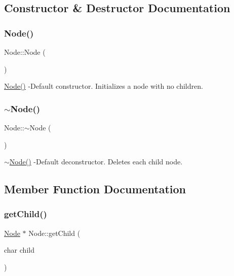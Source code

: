 \subsection{Constructor \& Destructor Documentation}
\mbox{\label{class_node_ad7a34779cad45d997bfd6d3d8043c75f}} 
\subsubsection{\texorpdfstring{Node()}{Node()}}
{\footnotesize\ttfamily Node\+::\+Node (\begin{DoxyParamCaption}{ }\end{DoxyParamCaption})}

\hyperlink{class_node_ad7a34779cad45d997bfd6d3d8043c75f}{Node()} -\/\+Default constructor. Initializes a node with no children. \mbox{\label{class_node_aa0840c3cb5c7159be6d992adecd2097c}} 
\subsubsection{\texorpdfstring{$\sim$\+Node()}{~Node()}}
{\footnotesize\ttfamily Node\+::$\sim$\+Node (\begin{DoxyParamCaption}{ }\end{DoxyParamCaption})}

\hyperlink{class_node_aa0840c3cb5c7159be6d992adecd2097c}{$\sim$\+Node()} -\/\+Default deconstructor. Deletes each child node. 

\subsection{Member Function Documentation}
\mbox{\label{class_node_a7d2c9441ae9f243e06d9f081bada8bad}} 
\subsubsection{\texorpdfstring{get\+Child()}{getChild()}}
{\footnotesize\ttfamily \hyperlink{class_node}{Node} $\ast$ Node\+::get\+Child (\begin{DoxyParamCaption}\item[{char}]{child }\end{DoxyParamCaption})}

